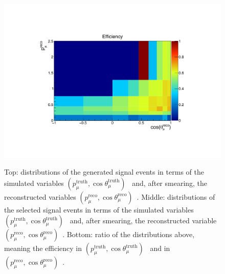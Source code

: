\begin{figure}[]
   {\includegraphics[width=.45\textwidth]{images/XSecPmuCosThetaMu/trkcostheta_trkmumom_efficiency_true_new}
   \label{fig:trkcostheta_trkmumom_efficiecy_true}} \quad
{} \\
\caption[Simulated Distributions and Efficiency in $(\cos\theta_\mu, p_\mu)$ Bins]{
Top: distributions of the generated signal events in terms of the simulated variables $(p_\mu^\text{truth}, \cos\theta_\mu^\text{truth})$~\protect{} and, after smearing, the reconstructed variables $(p_\mu^\text{reco}, \cos\theta_\mu^\text{reco})$~\protect{}. 
Middle: distributions of the selected signal events in terms of the simulated variables $(p_\mu^\text{truth}, \cos\theta_\mu^\text{truth})$~\protect{} and, after smearing, the reconstructed variable $(p_\mu^\text{reco}, \cos\theta_\mu^\text{reco})$~\protect{}.
Bottom: ratio of the distributions above, meaning the efficiency in $(p_\mu^\text{truth}, \cos\theta_\mu^\text{truth})$~\protect{} and in $(p_\mu^\text{reco}, \cos\theta_\mu^\text{reco})$~\protect{}.
}
\label{fig:trkcostheta_trkmom_eff_smear}
\end{figure}









